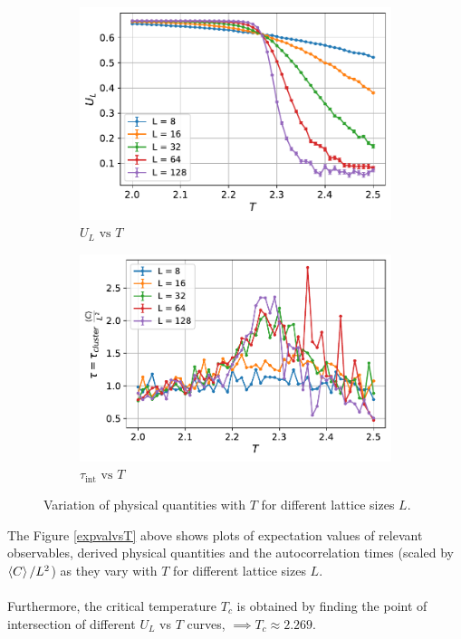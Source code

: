 \documentclass[../journal_main.tex]{subfiles}
\begin{document}
\begin{figure}[!htb]\ContinuedFloat
    \centering
    \begin{subfigure}[b]{0.47\textwidth}
        \centering
        \includegraphics[width=\textwidth]{images/expval vs T/U_L.pdf}
        \caption{$U_L \text{ vs } T$}
    \end{subfigure}
    \hspace{1em}  %
    \begin{subfigure}[b]{0.47\textwidth}
        \centering
        \includegraphics[width=\textwidth]{images/expval vs T/autocorr times.pdf}
        \caption{$\tau_\text{int} \text{ vs } T$}
    \end{subfigure}
    \caption{Variation of physical quantities with $T$ for different lattice sizes $L$.}
\end{figure}
\FloatBarrier
The Figure \ref{expvalvsT} above shows plots of expectation values of relevant observables, derived physical quantities and the autocorrelation times (scaled by $\expval{C}/L^2$) as they vary with $T$ for different lattice sizes $L$.~\\~\\
Furthermore, the critical temperature $T_c$ is obtained by finding the point of intersection of different $U_L$ vs $T$ curves, $\implies T_c \approx 2.269$.  
\end{document}
